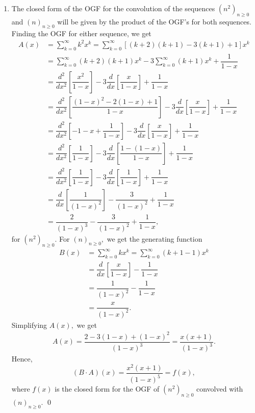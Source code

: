 \documentclass[12pt]{article}
\begin{document}
\begin{enumerate}
  \item The closed form of the OGF for the convolution of the
    sequences $(n^2)_{n \geq 0}$ and $(n)_{n \geq 0}$ will be given
    by the product of the OGF's for both sequences. Finding the OGF
    for either sequence, we get
    \begin{align*}
      A(x) &= \sum_{k = 0}^{\infty}k^2 x^k = \sum_{k = 0}^{\infty}
      [(k + 2)(k + 1) - 3(k + 1) + 1] x^k \\
      &= \sum_{k = 0}^\infty (k+2)(k + 1)x^k - 3\sum_{k = 0}^\infty
      (k+1)x^k  + \dfrac{1}{1-x} \\
      &= \dfrac{d^2}{dx^2}\left[\dfrac{x^2}{1-x}\right] -
      3\dfrac{d}{dx}\left[\dfrac{x}{1-x}\right] + \dfrac{1}{1-x} \\
      &= \dfrac{d^2}{dx^2}\left[\dfrac{(1-x)^2 - 2(1-x) +
      1}{1-x}\right] - 3\dfrac{d}{dx}\left[\dfrac{x}{1-x}\right] +
      \dfrac{1}{1-x} \\
      &= \dfrac{d^2}{dx^2}\left[-1 - x + \dfrac{1}{1 - x}\right] -
      3\dfrac{d}{dx}\left[\dfrac{x}{1-x}\right] + \dfrac{1}{1-x} \\
      &= \dfrac{d^2}{dx^2}\left[\dfrac{1}{1 - x}\right] -
      3\dfrac{d}{dx}\left[\dfrac{1 - (1 - x)}{1-x}\right] + \dfrac{1}{1-x} \\
      &= \dfrac{d^2}{dx^2}\left[\dfrac{1}{1 - x}\right] -
      3\dfrac{d}{dx}\left[\dfrac{1}{1-x}\right] + \dfrac{1}{1-x} \\
      &= \dfrac{d}{dx}\left[\dfrac{1}{(1 - x)^2}\right] -
      \dfrac{3}{(1-x)^2} + \dfrac{1}{1-x} \\
      &= \dfrac{2}{(1 - x)^3} - \dfrac{3}{(1-x)^2} + \dfrac{1}{1-x},
    \end{align*}
    for $(n^2)_{n \geq 0}.$ For $(n)_{n \geq 0},$ we get the
    generating function
    \begin{align*}
      B(x) &= \sum_{k = 0}^\infty kx^k = \sum_{k = 0}^\infty (k + 1 - 1)x^k \\
      &=\dfrac{d}{dx}\left[\dfrac{x}{1-x}\right] - \dfrac{1}{1-x} \\
      &= \dfrac{1}{(1-x)^2} - \dfrac{1}{1-x} \\
      &= \dfrac{x}{(1-x)^2}.
    \end{align*}
    Simplifying $A(x),$ we get
    \begin{align*}
      A(x) = \dfrac{2 - 3(1-x) + (1-x)^2}{(1-x)^3} = \dfrac{x(x + 1)}{(1-x)^3}.
    \end{align*}
    Hence, $$(B \cdot A)(x)  = \dfrac{x^2(x+1)}{(1-x)^5} = f(x),$$
    where $f(x)$ is the closed form for the OGF of $(n^2)_{n \geq 0}$
    convolved with $(n)_{n \geq 0}.$ \qed
\end{enumerate}
\end{document}
